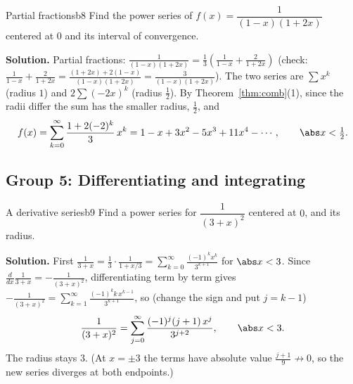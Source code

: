 \documentclass[11pt]{article}
\begin{document}
\begin{exmp}{Partial fractions}{b8}
Find the power series of $f(x)=\dfrac1{(1-x)(1+2x)}$ centered at $0$ and its interval of convergence.

\textbf{Solution.} Partial fractions: $\frac1{(1-x)(1+2x)}=\frac13\left(\frac1{1-x}+\frac2{1+2x}\right)$ (check: $\frac1{1-x}+\frac2{1+2x}=\frac{(1+2x)+2(1-x)}{(1-x)(1+2x)}=\frac3{(1-x)(1+2x)}$). The two series are $\sum x^k$ (radius $1$) and $2\sum(-2x)^k$ (radius $\frac12$). By Theorem~\ref{thm:comb}(1), since the radii differ the sum has the smaller radius, $\frac12$, and
\[
f(x)=\sum_{k=0}^\infty\frac{1+2(-2)^k}3\,x^k=1-x+3x^2-5x^3+11x^4-\cdots,\qquad\abs x<\tfrac12 .
\]
\end{exmp}

\subsection*{Group 5: Differentiating and integrating}

\begin{exmp}{A derivative series}{b9}
Find a power series for $\dfrac1{(3+x)^2}$ centered at $0$, and its radius.

\textbf{Solution.} First $\frac1{3+x}=\frac13\cdot\frac1{1+x/3}=\sum_{k=0}^\infty\frac{(-1)^kx^k}{3^{k+1}}$ for $\abs x<3$. Since $\frac d{dx}\frac1{3+x}=-\frac1{(3+x)^2}$, differentiating term by term gives $-\frac1{(3+x)^2}=\sum_{k=1}^\infty\frac{(-1)^kk\,x^{k-1}}{3^{k+1}}$, so (change the sign and put $j=k-1$)
\[
\frac1{(3+x)^2}=\sum_{j=0}^\infty\frac{(-1)^j(j+1)\,x^j}{3^{j+2}},\qquad\abs x<3 .
\]
The radius stays $3$. (At $x=\pm3$ the terms have absolute value $\frac{j+1}9\not\to0$, so the new series diverges at both endpoints.)
\end{exmp}
\end{document}

